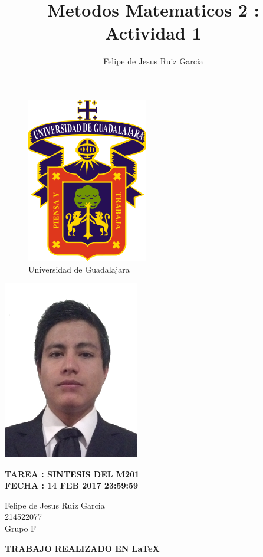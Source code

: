 \documentclass[12pt,a4paper]{book}
\author{Felipe de Jesus Ruiz Garcia}
\title{Metodos Matematicos 2 : Actividad 1}
\begin{document}
\begin{figure}[hbtp]
\centering
\includegraphics[scale=.5]{../PRE/udg.png}\\
Universidad de Guadalajara
\end{figure}

\begin{center}
\includegraphics[scale=.5]{../PRE/profile.png}\\
\end{center}

\begin{center}
\textbf{TAREA : SINTESIS DEL M201 \\}
\textbf{FECHA : 14 FEB 2017 23:59:59 \\}

Felipe de Jesus Ruiz Garcia 
\\ 214522077
\\ Grupo F  

\end{center}
 \bigskip

\begin{figure}[hbtp]
\centering

\end{figure}
\begin{center}
\textbf{TRABAJO REALIZADO EN \LaTeX} 
\end{center}
\end{document}
